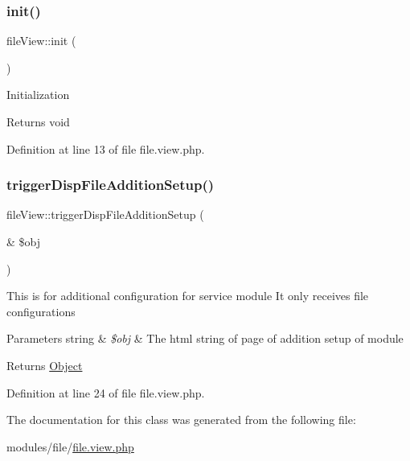 \subsubsection{\texorpdfstring{init()}{init()}}
{\footnotesize\ttfamily file\+View\+::init (\begin{DoxyParamCaption}{ }\end{DoxyParamCaption})}

Initialization \begin{DoxyReturn}{Returns}
void 
\end{DoxyReturn}


Definition at line 13 of file file.\+view.\+php.

\mbox{\label{classfileView_a7df980966b9a93c9416959ba21c14c55}} 
\subsubsection{\texorpdfstring{trigger\+Disp\+File\+Addition\+Setup()}{triggerDispFileAdditionSetup()}}
{\footnotesize\ttfamily file\+View\+::trigger\+Disp\+File\+Addition\+Setup (\begin{DoxyParamCaption}\item[{\&}]{\$obj }\end{DoxyParamCaption})}

This is for additional configuration for service module It only receives file configurations


\begin{DoxyParams}[1]{Parameters}
string & {\em \$obj} & The html string of page of addition setup of module \\
\hline
\end{DoxyParams}
\begin{DoxyReturn}{Returns}
\hyperlink{classObject}{Object} 
\end{DoxyReturn}


Definition at line 24 of file file.\+view.\+php.



The documentation for this class was generated from the following file\+:\begin{DoxyCompactItemize}
\item 
modules/file/\hyperlink{file_8view_8php}{file.\+view.\+php}\end{DoxyCompactItemize}
